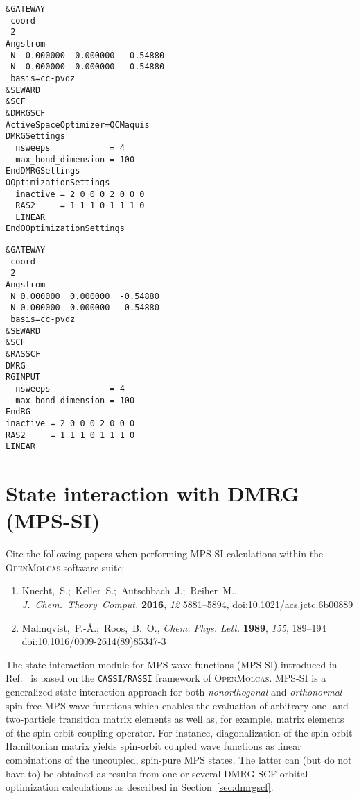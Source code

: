 \documentclass[bibliography=totoc,12pt,a4paper]{scrartcl}
\newcommand{\mol}{\textsc{OpenMolcas}}
\newcommand{\hostp}{\mol}
\newcommand{\kwd}[1]{\texttt{#1}}
\begin{document}
\begin{lstlisting}[language=molcas,caption={(File \texttt{001.input} in the test directory) 
				   Input example for a DMRG-SCF calculation with the \kwd{DMRGSCF} module (N$_2$, 6 orbitals, with symmetry).},label=lst:dmrgscf]
&GATEWAY
 coord
 2
Angstrom
 N  0.000000  0.000000  -0.54880
 N  0.000000  0.000000   0.54880
 basis=cc-pvdz
&SEWARD
&SCF
&DMRGSCF
ActiveSpaceOptimizer=QCMaquis
DMRGSettings
  nsweeps            = 4
  max_bond_dimension = 100
EndDMRGSettings
OOptimizationSettings
  inactive = 2 0 0 0 2 0 0 0
  RAS2     = 1 1 1 0 1 1 1 0
  LINEAR
EndOOptimizationSettings
\end{lstlisting}
\vspace{-0.5em}
\begin{lstlisting}[language=molcas,caption={Input example for a DMRG-SCF calculation with the \kwd{RASSCF} module (N$_2$, 6 orbitals, with symmetry)},label=lst:rasscf]
&GATEWAY
 coord
 2
Angstrom
 N 0.000000  0.000000  -0.54880
 N 0.000000  0.000000   0.54880
 basis=cc-pvdz
&SEWARD
&SCF
&RASSCF
DMRG
RGINPUT
  nsweeps            = 4
  max_bond_dimension = 100
EndRG
inactive = 2 0 0 0 2 0 0 0
RAS2     = 1 1 1 0 1 1 1 0
LINEAR
\end{lstlisting}

\clearpage
\newpage

\section{State interaction with DMRG (MPS-SI)}
\label{sec:mps-si}

\begin{framed}
 \noindent Cite the following papers when performing MPS-SI calculations within the \mol{} software suite:
  \begin{enumerate}
    \item Knecht,~S.;~Keller~S.;~Autschbach~J.;~Reiher~M., \emph{J.~Chem.~Theory~Comput.} \textbf{2016}, \emph{12} 5881--5894, \href{https://doi.org/10.1021/acs.jctc.6b00889}{doi:10.1021/acs.jctc.6b00889}
    \item Malmqvist,~P.-{\AA}.;~Roos,~B.~O., \emph{Chem. Phys. Lett.} \textbf{1989}, \emph{155}, 189--194\\ \href{https://doi.org/10.1016/0009-2614(89)85347-3}{doi:10.1016/0009-2614(89)85347-3}
  \end{enumerate}
\end{framed}

The state-interaction module for MPS wave functions (MPS-SI) introduced in Ref.~\cite{knec16b} is based on the \texttt{CASSI/RASSI} framework \cite{malm89,malm02} of \hostp.
MPS-SI is a generalized state-interaction approach for both \textit{nonorthogonal} and \textit{orthonormal} spin-free MPS wave
functions which enables the evaluation of arbitrary one- and two-particle transition matrix elements as well as, for example, matrix elements of the spin-orbit coupling operator.
For instance, diagonalization of the spin-orbit Hamiltonian matrix yields spin-orbit coupled wave functions as linear combinations of the uncoupled, spin-pure MPS states.
The latter can (but do not have to) be obtained as results from one or several DMRG-SCF orbital optimization calculations as described in Section~\ref{sec:dmrgscf}.
\end{document}
